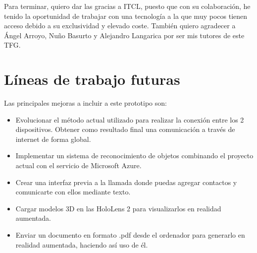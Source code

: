 Para terminar, quiero dar las gracias a ITCL, puesto que con su colaboración, he tenido la oportunidad de trabajar con una tecnología a la que muy pocos tienen acceso debido a su exclusividad y elevado coste. También quiero agradecer a Ángel Arroyo, Nuño Basurto y Alejandro Langarica por ser mis tutores de este TFG.

\section{Líneas de trabajo futuras}

Las principales mejoras a incluir a este prototipo son:
\begin{itemize}
	\item Evolucionar el método actual utilizado para realizar la conexión entre los 2 dispositivos. Obtener como resultado final una comunicación a través de internet de forma global.
	\item Implementar un sistema de reconocimiento de objetos combinando el proyecto actual con el servicio de Microsoft Azure.
	\item Crear una interfaz previa a la llamada donde puedas agregar contactos y comunicarte con ellos mediante texto.
	\item Cargar modelos 3D en las HoloLens 2 para visualizarlos en realidad aumentada.
	\item Enviar un documento en formato .pdf desde el ordenador para generarlo en realidad aumentada, haciendo así uso de él.
\end{itemize}




